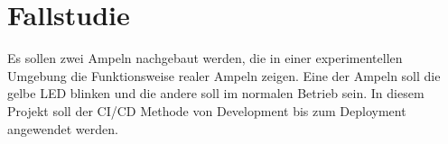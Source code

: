 \chapter{Fallstudie}

Es sollen zwei Ampeln nachgebaut werden, die  in einer experimentellen Umgebung die Funktionsweise realer Ampeln zeigen. Eine der Ampeln soll die gelbe LED blinken und die andere soll im normalen Betrieb sein. In diesem Projekt soll der \ac{CI/CD} Methode von Development bis zum Deployment angewendet werden.











